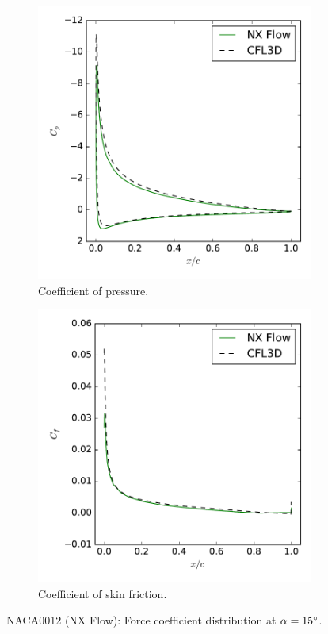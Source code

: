 \begin{figure}[ht!]
\centering
\begin{subfigure}{.45\textwidth}
  \centering
  \includegraphics[width=1.0\textwidth]{figs/naca0012/cp_15.pdf}
  \caption{Coefficient of pressure.}
\end{subfigure}%
\begin{subfigure}{.45\textwidth}
  \centering
  \includegraphics[width=1.0\textwidth]{figs/naca0012/cf_15.pdf}
  \caption{Coefficient of skin friction.}
\end{subfigure}
\caption{NACA0012 (NX Flow): Force coefficient distribution at $\alpha = 15^\circ$.}
\label{fig:naca0012_15}
\end{figure}
